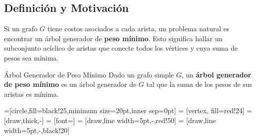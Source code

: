 \subsection{Definición y Motivación}

Si un grafo $G$ tiene costos asociados a cada arista, un problema natural es encontrar un árbol generador de \textbf{peso mínimo}. Esto significa hallar un subconjunto acíclico de aristas que conecte todos los vértices y cuya suma de pesos sea mínima.

\begin{definitionblock}{Árbol Generador de Peso Mínimo}
Dado un grafo simple $G$, un \textbf{árbol generador de peso mínimo} es un árbol generador de $G$ tal que la suma de los pesos de sus aristas es mínima.
\end{definitionblock}

\begin{center}
=[circle,fill=black!25,minimum size=20pt,inner sep=0pt]
 = [vertex, fill=red!24]
 = [draw,thick,-]
 = [font=\small]
 = [draw,line width=5pt,-,red!50]
 = [draw,line width=5pt,-,black!20]

\end{center}


